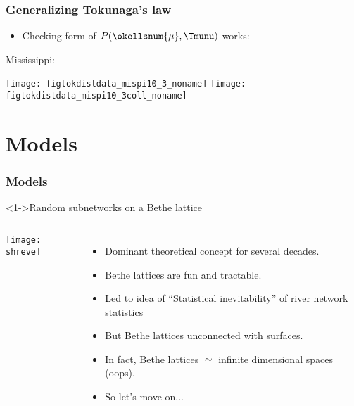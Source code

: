 \begin{frame}[label=]
  \frametitle{Generalizing Tokunaga's law}

  \begin{itemize}
  \item Checking form of $P(\okellsnum{\mu},\Tmunu)$ works:
  \end{itemize}

  Mississippi:
  
      \texttt{[image: figtokdistdata\_mispi10\_3\_noname]}
      \texttt{[image: figtokdistdata\_mispi10\_3coll\_noname]}

\end{frame}


\section{Models}

\begin{frame}

  \showtarotcards{0.35}{
    john-dory,
    overview,
    complex-networks,
    random-networks,
    scale-free-networks,
    small-world-networks,
    theory-six-degrees,
    landscapes-of-forking-paths,
    networks-of-blood,
    trees-of-reality,
    orders-of-streams,
    laws-of-branching,
    unknown-mechanism,
}

\end{frame}


\begin{frame}[label=]
  \frametitle{Models}

  \begin{block}<1->{Random subnetworks on a Bethe lattice\cite{shreve1967a}}
    \begin{columns}
      \texttt{[image: shreve]}
      \begin{itemize}
      \item<2-> Dominant theoretical concept for several decades.
      \item<3-> Bethe lattices are fun and tractable.
      \item<4-> Led to idea of ``Statistical inevitability'' of river network statistics\cite{kirchner1993a}
      \item<5-> But Bethe lattices unconnected with surfaces.
      \item<6-> In fact, Bethe lattices $\simeq$ infinite dimensional spaces (oops).
      \item<7-> So let's move on...
      \end{itemize}
    \end{columns}
  \end{block}

\end{frame}

